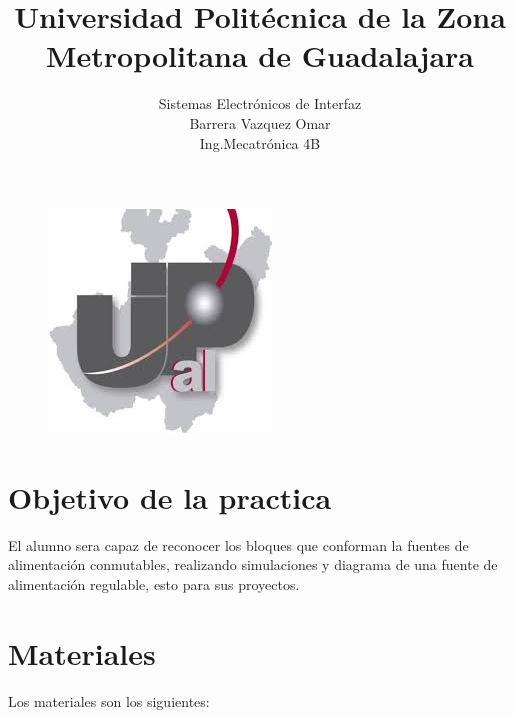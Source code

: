 \documentclass[11pt,a4paper]{article}
\title{Universidad Politécnica de la Zona Metropolitana de Guadalajara}
\begin{document}
\maketitle

\begin{figure}[h]
\begin{center}
\includegraphics[scale=1]{1.jpeg}
\end{center}
\end{figure}

\begin{center}
\author{Sistemas Electrónicos de Interfaz\\
Barrera Vazquez Omar\\
Ing.Mecatrónica 4B}
\end{center}

\newpage

\section{Objetivo de la practica}

El alumno sera capaz de reconocer los bloques que conforman la fuentes de alimentación conmutables, realizando simulaciones y diagrama de una fuente de alimentación regulable, esto para sus proyectos.

\section{Materiales}

Los materiales son los siguientes:
\end{document}
